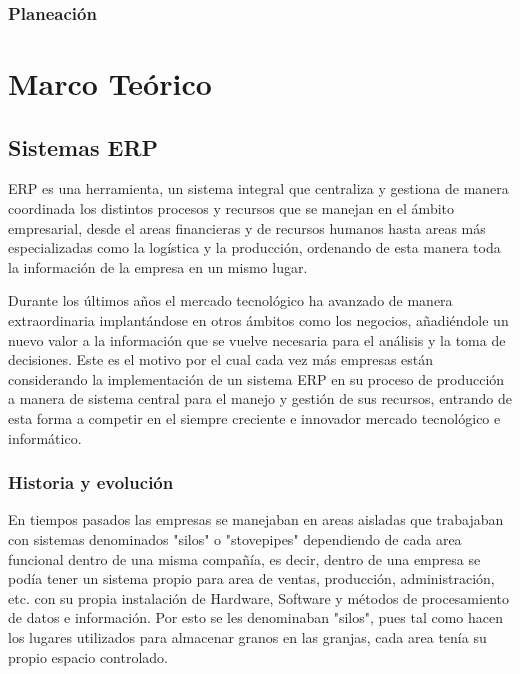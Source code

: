 \documentclass[12pt,letterpaper,spanish]{report}
\begin{document}
\subsection{Planeación}




\chapter{Marco Teórico}
\newpage

\section{Sistemas ERP}
ERP es una herramienta, un sistema integral que centraliza y gestiona de manera coordinada los distintos procesos y recursos que se manejan en el ámbito empresarial, desde el areas financieras y de recursos humanos hasta areas más especializadas como la logística y la producción, ordenando de esta manera toda la información de la empresa en un mismo lugar.

Durante los últimos años el mercado tecnológico ha avanzado de manera extraordinaria implantándose en otros ámbitos como los negocios, añadiéndole un nuevo valor a la información que se vuelve necesaria para el análisis y la toma de decisiones. Este es el motivo por el cual cada vez más empresas están considerando la implementación de un sistema ERP en su proceso de producción a manera de sistema central para el manejo y gestión de sus recursos, entrando de esta forma a competir en el siempre creciente e innovador mercado tecnológico e informático. 

\subsection{Historia y evolución}
En tiempos pasados las empresas se manejaban en areas aisladas que trabajaban con sistemas denominados "silos" o "stovepipes" dependiendo de cada area funcional dentro de una misma compañía, es decir, dentro de una empresa se podía tener un sistema propio para area de ventas, producción, administración, etc. con su propia instalación de Hardware, Software y métodos de procesamiento de datos e información. Por esto se les denominaban "silos", pues tal como hacen los lugares utilizados para almacenar granos en las granjas, cada area tenía su propio espacio controlado.
\end{document}
